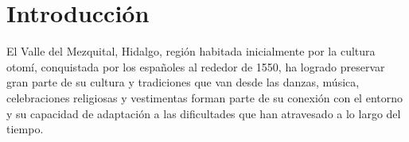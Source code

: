 \section{Introducción}





El Valle del Mezquital, Hidalgo, región habitada inicialmente por la cultura otomí, conquistada por los españoles al rededor de 1550, ha logrado preservar gran parte de su cultura y tradiciones que van desde las danzas, música, celebraciones religiosas y vestimentas forman parte de su conexión con el entorno y su capacidad de adaptación a las dificultades que han atravesado a lo largo del tiempo.

